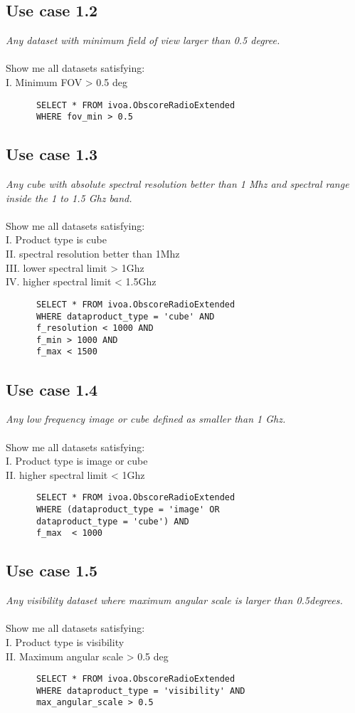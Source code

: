 \documentclass[11pt,a4paper]{ivoa}
\begin{document}
\subsection{Use case 1.2}
\textit{Any  dataset with minimum field of view larger than 0.5 degree.}\\
\\
Show me all datasets satisfying:\\
I. Minimum FOV > 0.5 deg \\
\begin{verbatim}
      SELECT * FROM ivoa.ObscoreRadioExtended
      WHERE fov_min > 0.5 
\end{verbatim}
\subsection{Use case 1.3}
\textit{Any cube  with absolute spectral resolution better than 1 Mhz and spectral range inside the 1 to 1.5 Ghz band.}\\ \\
Show me all datasets satisfying:\\
I. Product type is cube \\
II. spectral resolution better than 1Mhz \\
III. lower spectral limit > 1Ghz \\
IV. higher spectral limit < 1.5Ghz 
\begin{verbatim}
      SELECT * FROM ivoa.ObscoreRadioExtended
      WHERE dataproduct_type = 'cube' AND
      f_resolution < 1000 AND
      f_min > 1000 AND
      f_max < 1500
\end{verbatim}
\subsection{Use case 1.4}
\textit{Any low frequency image or cube  defined as smaller than 1 Ghz.}\\ \\
Show me all datasets satisfying:\\
I. Product type is image or cube \\
II. higher spectral limit < 1Ghz
\begin{verbatim}
      SELECT * FROM ivoa.ObscoreRadioExtended
      WHERE (dataproduct_type = 'image' OR
      dataproduct_type = 'cube') AND
      f_max  < 1000
\end{verbatim}
\subsection{Use case 1.5}
\textit{Any visibility dataset  where  maximum angular scale is larger than 0.5degrees.}\\ \\
Show me all datasets satisfying:\\
I. Product type is visibility \\
II. Maximum angular scale  >  0.5 deg 
\begin{verbatim}
      SELECT * FROM ivoa.ObscoreRadioExtended
      WHERE dataproduct_type = 'visibility' AND
      max_angular_scale > 0.5 
\end{verbatim}
\end{document}
